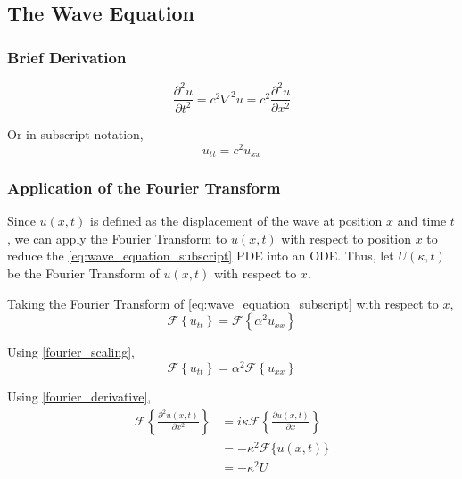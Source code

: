 \subsection{The Wave Equation}

\subsubsection{Brief Derivation}
\begin{equation} \label{eq:wave_equation}
    \frac{\partial^2 u}{\partial t^2} = c^2 \nabla^2 u = c^2 \frac{\partial^2 u}{\partial x^2}
\end{equation}

\noindent
Or in subscript notation,
\begin{equation} \label{eq:wave_equation_subscript}
    u_{tt} = c^2 u_{xx}
\end{equation}

\subsubsection{Application of the Fourier Transform}
Since \(u(x,t)\) is defined as the displacement of the wave at position \(x\) and time \(t\), we can apply the Fourier Transform to \(u(x,t)\) with respect to position \(x\) to reduce the \cref{eq:wave_equation_subscript} PDE into an ODE. Thus, let \(U(\kappa,t)\) be the Fourier Transform of \(u(x,t)\) with respect to \(x\).

\vspace{5mm}
\noindent
Taking the Fourier Transform of \cref{eq:wave_equation_subscript} with respect to \(x\),
\begin{equation}
    \mathcal{F} \left\{ u_{tt} \right\} = \mathcal{F} \left\{ \alpha^2 u_{xx} \right\}
\end{equation}

\noindent
Using \cref{fourier_scaling},
\begin{equation}
    \mathcal{F} \left\{ u_{tt} \right\} = \alpha^2 \mathcal{F} \left\{ u_{xx} \right\}
\end{equation}

\noindent
Using \cref{fourier_derivative},
\begin{align}
    \mathcal{F} \left\{ \frac{\partial^2 u(x, t)}{\partial x^2} \right\} & = i \kappa \mathcal{F} \left\{ \frac{\partial u(x, t)}{\partial x} \right\} \\
    & = -\kappa^2 \mathcal{F}\{ u(x, t) \} \\
    & = -\kappa^2 U
\end{align}

